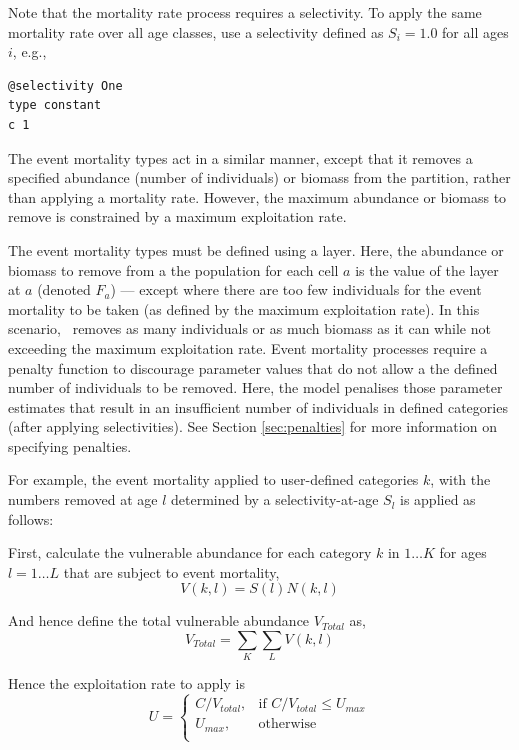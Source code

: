 Note that the mortality rate process requires a selectivity. To apply the same mortality rate over all age classes, use a selectivity defined as $S_i=1.0$ for all ages $i$, e.g.,

\begin{verbatim}
@selectivity One
type constant
c 1
\end{verbatim}

The event mortality types act in a similar manner, except that it removes a specified abundance (number of individuals) or biomass from the partition, rather than applying a mortality rate. However, the maximum abundance or biomass to remove is constrained by a maximum exploitation rate.

The event mortality types must be defined using a layer. Here, the abundance or biomass to remove from a the population for each cell $a$ is the value of the layer at $a$ (denoted $F_a$) --- except where there are too few individuals for the event mortality to be taken (as defined by the maximum exploitation rate). In this scenario, \SPM\ removes as many individuals or as much biomass as it can while not exceeding the maximum exploitation rate. Event mortality processes require a penalty function to discourage parameter values that do not allow a the defined number of individuals to be removed. Here, the model penalises those parameter estimates that result in an insufficient number of individuals in defined categories (after applying selectivities). See Section \ref{sec:penalties} for more information on specifying penalties.

For example, the event mortality applied to user-defined categories $k$, with the numbers removed at age $l$ determined by a selectivity-at-age $S_l$ is applied as follows:

First, calculate the vulnerable abundance for each category $k$ in $1 \ldots K$ for ages $l = 1 \ldots L$ that are subject to event mortality,
\begin{equation}
  V(k,l) = S(l) N(k,l)
\end{equation}

And hence define the total vulnerable abundance $V_{Total}$ as,
\begin{equation}
  V_{Total}  = \sum\limits_K {\sum\limits_L {V(k,l)}} 
\end{equation}

Hence the exploitation rate to apply is 
\begin{equation}
U = \begin{cases}
  C/V_{total}, & \text{if $C/V_{total} \leq U_{max}$} \\
  U_{max}, & \text{otherwise}\\ 
  \end{cases} 
\end{equation}

